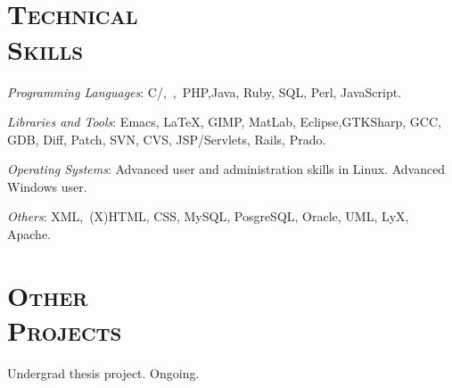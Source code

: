 \begin{resume}
 \begin{formatb}
   \\
   \body\\
 \end{formatb}



\section{\textsc{Technical\\ Skills}}

\emph{Programming Languages}: C/\Cplusplus,\ \CSharp,\ PHP,Java, Ruby, SQL, Perl, JavaScript.

\emph{Libraries and Tools}: Emacs, \LaTeX, GIMP, MatLab, Eclipse,GTKSharp, GCC, GDB, Diff, Patch, SVN, CVS, JSP/Servlets, Rails, Prado.

\emph{Operating Systems}: Advanced user and administration skills in Linux.  Advanced Windows user.

\emph{Others}: XML,\ (X)HTML, CSS, MySQL, PosgreSQL, Oracle, UML, LyX, Apache.


\section{\textsc{Other\\  Projects}}

\begin{position}
Undergrad thesis project. Ongoing.
\end{position}


\end{resume}
